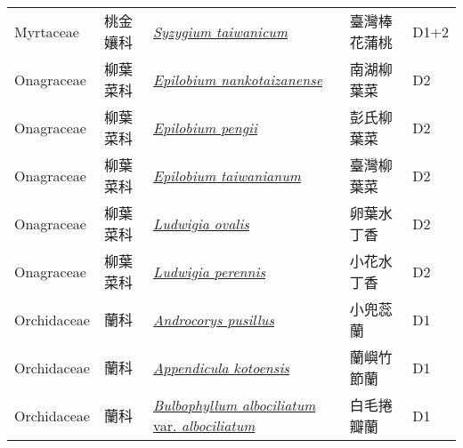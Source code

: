 {\begin{longtable}{p{2.5cm}p{2.5cm}p{4.5cm}p{2.5cm}p{3cm}}
    Myrtaceae & 桃金孃科 & \href{http://www.theplantlist.org/tpl1.1/search?q=Syzygium+taiwanicum}{\textit{Syzygium taiwanicum} } & 臺灣棒花蒲桃 & D1+2 \index{Syzygium@\textit{Syzygium}!taiwanicum@\textit{taiwanicum}}  \index{臺灣棒花蒲桃} \\
    Onagraceae & 柳葉菜科 & \href{http://www.theplantlist.org/tpl1.1/search?q=Epilobium+nankotaizanense}{\textit{Epilobium nankotaizanense} } & 南湖柳葉菜 & D2 \index{Epilobium@\textit{Epilobium}!nankotaizanense@\textit{nankotaizanense}}  \index{南湖柳葉菜} \\
    Onagraceae & 柳葉菜科 & \href{http://www.theplantlist.org/tpl1.1/search?q=Epilobium+pengii}{\textit{Epilobium pengii} } & 彭氏柳葉菜 & D2 \index{Epilobium@\textit{Epilobium}!pengii@\textit{pengii}}  \index{彭氏柳葉菜} \\
    Onagraceae & 柳葉菜科 & \href{http://www.theplantlist.org/tpl1.1/search?q=Epilobium+taiwanianum}{\textit{Epilobium taiwanianum} } & 臺灣柳葉菜 & D2 \index{Epilobium@\textit{Epilobium}!taiwanianum@\textit{taiwanianum}}  \index{臺灣柳葉菜} \\
    Onagraceae & 柳葉菜科 & \href{http://www.theplantlist.org/tpl1.1/search?q=Ludwigia+ovalis}{\textit{Ludwigia ovalis} } & 卵葉水丁香 & D2 \index{Ludwigia@\textit{Ludwigia}!ovalis@\textit{ovalis}}  \index{卵葉水丁香} \\
    Onagraceae & 柳葉菜科 & \href{http://www.theplantlist.org/tpl1.1/search?q=Ludwigia+perennis}{\textit{Ludwigia perennis} } & 小花水丁香 & D2 \index{Ludwigia@\textit{Ludwigia}!perennis@\textit{perennis}}  \index{小花水丁香} \\
    Orchidaceae & 蘭科 & \href{http://www.theplantlist.org/tpl1.1/search?q=Androcorys+pusillus}{\textit{Androcorys pusillus} } & 小兜蕊蘭 & D1 \index{Androcorys@\textit{Androcorys}!pusillus@\textit{pusillus}}  \index{小兜蕊蘭} \\
    Orchidaceae & 蘭科 & \href{http://www.theplantlist.org/tpl1.1/search?q=Appendicula+kotoensis}{\textit{Appendicula kotoensis} } & 蘭嶼竹節蘭 & D1 \index{Appendicula@\textit{Appendicula}!kotoensis@\textit{kotoensis}}  \index{蘭嶼竹節蘭} \\
    Orchidaceae & 蘭科 & \href{http://www.theplantlist.org/tpl1.1/search?q=Bulbophyllum+albociliatum+var.+albociliatum}{\textit{Bulbophyllum albociliatum} var. \textit{albociliatum} } & 白毛捲瓣蘭 & D1 \index{Bulbophyllum@\textit{Bulbophyllum}!albociliatum@\textit{albociliatum}!var. albociliatum@var. \textit{albociliatum}}  \index{白毛捲瓣蘭} \\

\end{longtable}}
